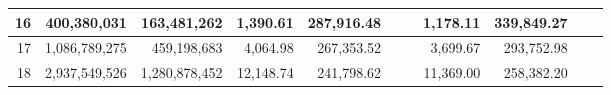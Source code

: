 \documentclass[conference]{IEEEtran}
\newcommand{\matr}[1]{\mathbf{#1}} %
\begin{document}
\begin{table*}[tb]
\begin{threeparttable}[c]
\begin{tabular}{r|rr|rr|rr|rr|rr}
16 & 400,380,031 & 163,481,262 & 1,390.61 & 287,916.48 &  &  & 1,178.11 & 339,849.27 &  &  \\                             
\hline                                                                                                                    
17 & 1,086,789,275 & 459,198,683 & 4,064.98 & 267,353.52 &  &  & 3,699.67 & 293,752.98 &  &  \\                           
\hline                                                                                                                    
18 & 2,937,549,526 & 1,280,878,452 & 12,148.74 & 241,798.62 &  &  & 11,369.00 & 258,382.20 &  &  \\
\end{tabular}
\end{threeparttable}
\vspace{-1.5em}
\end{table*}






%
%
\end{document}
